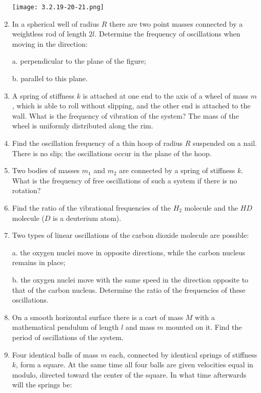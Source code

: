 \documentclass{article}
\begin{document}
\begin{enumerate}[label=3.2.\arabic*]
\begin{center}
    \texttt{[image: 3.2.19-20-21.png]}
\end{center}

\item In a spherical well of radius $R$ there are two point masses connected by a weightless rod of length $2 l$. Determine the frequency of oscillations when moving in the direction: 

a. perpendicular to the plane of the figure; 

b. parallel to this plane.

\item A spring of stiffness $k$ is attached at one end to the axis of a wheel of mass $m$, which is able to roll without slipping, and the other end is attached to the wall. What is the frequency of vibration of the system? The mass of the wheel is uniformly distributed along the rim.

\item Find the oscillation frequency of a thin hoop of radius $R$ suspended on a nail. There is no slip; the oscillations occur in the plane of the hoop.

\item Two bodies of masses $m_1$ and $m_2$ are connected by a spring of stiffness $k$. What is the frequency of free oscillations of such a system if there is no rotation?

\item Find the ratio of the vibrational frequencies of the $H_2$ molecule and the $H D$ molecule ($D$ is a deuterium atom).

\item Two types of linear oscillations of the carbon dioxide molecule are possible: 

a. the oxygen nuclei move in opposite directions, while the carbon nucleus remains in place; 

b. the oxygen nuclei move with the same speed in the direction opposite to that of the carbon nucleus. Determine the ratio of the frequencies of these oscillations.

\item On a smooth horizontal surface there is a cart of mass $M$ with a mathematical pendulum of length $l$ and mass $m$ mounted on it. Find the period of oscillations of the system.

\item Four identical balls of mass $m$ each, connected by identical springs of stiffness $k$, form a square. At the same time all four balls are given velocities equal in modulo, directed toward the center of the square. In what time afterwards will the springs be: 


\end{enumerate}
\end{document}
